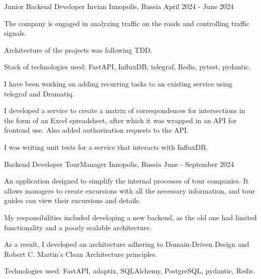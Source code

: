 \begin{cventries}
  \cventry
    {Junior Backend Developer} %
    {Invian} %
    {Innopolis, Russia} %
    {April 2024 - June 2024} %
    {
      \begin{cvitems} %
        \item {The company is engaged in analyzing traffic on the roads and controlling traffic signals. }
        \item {Architecture of the projects was following TDD. }
        \item {Stack of technologies used: FastAPI, InfluxDB, telegraf, Redis, pytest, pydantic. }
        \item {I have been working on adding recurring tasks to an existing service using telegraf and Dramatiq. }
        \item {I developed a service to create a matrix of correspondences for intersections in the form of an Excel spreadsheet, after which it was wrapped in an API for frontend use. Also added authorization requests to the API. }
        \item {I was writing unit tests for a service that interacts with InfluxDB.}
      \end{cvitems}
    }
    
    \cventry
    {Backend Developer} %
    {TourManager} %
    {Innopolis, Russia} %
    {June - September 2024} %
    {
      \begin{cvitems} %
        \item {An application designed to simplify the internal processes of tour companies. It allows managers to create excursions with all the necessary information, and tour guides can view their excursions and details.}
        \item {My responsibilities included developing a new backend, as the old one had limited functionality and a poorly scalable architecture.}
        \item {As a result, I developed an architecture adhering to Domain-Driven Design and Robert C. Martin's Clean Architecture principles.}
        \item {Technologies used: FastAPI, adaptix, SQLAlchemy, PostgreSQL, pydantic, Redis.}
      \end{cvitems}
  }
\end{cventries}
